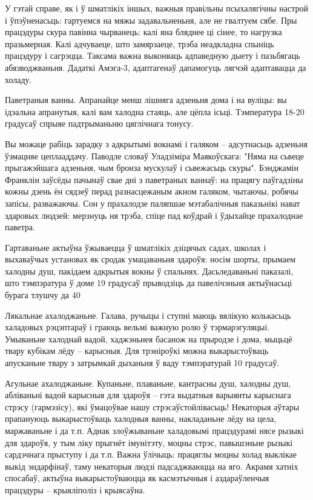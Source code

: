 У гэтай справе, як і ў шматлікіх іншых, важныя правільны псыхалягічны настрой і ўпэўненасьць: гартуемся на мяжы задавальненьня, але не гвалтуем сябе. Пры працэдуры скура павінна чырванець: калі яна бляднее ці сінее, то нагрузка празьмерная. Калі адчуваеце, што замярзаеце, трэба неадкладна спыніць працэдуру і сагрэцца. Таксама важна выконваць адпаведную дыету і пазьбягаць абязводжваньня. Дадаткі Амэга-3, адаптагенаў дапамогуць лягчэй адаптавацца да холаду.

Паветраныя ванны. Апранайце менш лішняга адзеньня дома і на вуліцы: вы ідэальна апранутыя, калі вам халодна стаяць, але цёпла ісьці. Тэмпература 18-20 градусаў спрыяе падтрыманьню цяглічнага тонусу.

Вы можаце рабіць зарадку з адкрытымі вокнамі і галяком – адсутнасьць адзеньня ўзмацняе цеплааддачу. Паводле словаў Уладзіміра Маякоўскага: "Няма на сьвеце прыгажэйшага адзеньня, чым бронза мускулаў і сьвежасьць скуры". Бэнджамін Франклін заўсёды пачынаў свае дні з паветраных ваннаў: на працягу паўгадзіны кожны дзень ён сядзеў перад разнасцежаным акном галяком, чытаючы, робячы запісы, разважаючы. Сон у прахалодзе паляпшае мэтабалічныя паказьнікі нават здаровых людзей: мерзнуць ня трэба, спіце пад коўдрай і ўдыхайце прахалоднае паветра.

Гартаваньне актыўна ўжываецца ў шматлікіх дзіцячых садах, школах і выхаваўчых установах як сродак умацаваньня здароўя: носім шорты, прымаем халодны душ, пакідаем адкрытыя вокны ў спальнях. Дасьледаваньні паказалі, што тэмпэратура ў доме 19 градусаў прыводзіць да павелічэньня актыўнасьці бурага тлушчу да 40%

Лякальнае ахалоджаньне. Галава, ручыцы і ступні маюць вялікую колькасьць халадовых рэцэптараў і граюць вельмі важную ролю ў тэрмарэгуляцыі. Умываньне халоднай вадой, хаджэньнея басанож на прыродзе і дома, мыцьцё твару кубікам лёду – карысныя. Для трэніроўкі можна выкарыстоўваць апусканьне твару з затрымкай дыханьня ў ваду тэмпэратурай 10 градусаў.

Агульнае ахалоджаньне. Купаньне, плаваньне, кантрасны душ, халодны душ, абліваньні вадой карысныя для здароўя – гэта выдатныя варыянты карыснага стрэсу (гармэзісу), які ўмацоўвае нашу стрэсаўстойлівасьць! Некаторыя аўтары прапануюць выкарыстоўваць халодныя ванны, накладаньне лёду на цела, маржаваньне і да т.п. Аднак злоўжываньне халадовымі працэдурамі нясе рызыкі для здароўя, у тым ліку прыгнёт імунітэту, моцны стрэс, павышэньне рызыкі сардэчнага прыступу і да т.п. Важна ўлічыць: працяглы моцны холад выклікае выкід эндарфінаў, таму некаторыя людзі падсаджваюцца на яго. Акрамя хатніх спосабаў, актыўна выкарыстоўваюцца як касмэтычныя і аздараўленчыя працэдуры – крыяліполіз і крыясаўна.

